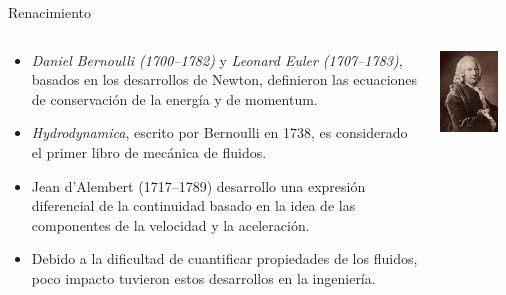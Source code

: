 \documentclass [xcolor=svgnames, t] {beamer}
\begin{document}
\begin{frame}{Renacimiento}
\begin{columns}
\vspace{-0.4cm}
\begin{exampleblock}{}
\begin{itemize}
\item \emph{Daniel Bernoulli (1700–1782)} y \emph{Leonard Euler (1707–1783)}, basados en los desarrollos de Newton, definieron las ecuaciones de conservación de la energía y de momentum.
\item \emph{Hydrodynamica}, escrito por Bernoulli en 1738, es considerado el primer libro de mecánica de fluidos.
\item Jean d’Alembert (1717–1789) desarrollo una expresión diferencial de la continuidad basado en la idea de las componentes de la velocidad y la aceleración.
\item Debido a la dificultad de cuantificar propiedades de los fluidos, poco impacto tuvieron estos desarrollos en la ingeniería. 
\end{itemize}
\end{exampleblock}
\vspace{-0.8cm}
\begin{center}
\includegraphics[width=0.8\textwidth]{berno}\\

\end{center}
\end{columns}
\end{frame}
\end{document}
